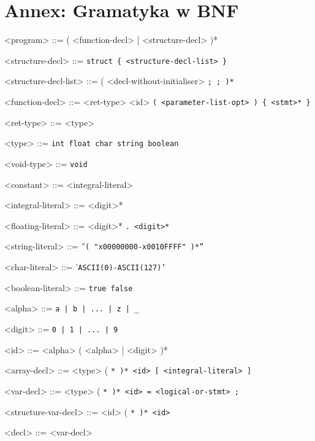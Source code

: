 \section{Annex: Gramatyka w BNF}

    \setlength{\grammarindent}{12em}

    \begin{grammar}
        <program> ::= ( <function-decl> | <structure-decl> )*

        <structure-decl> ::= \tt{struct} \tt{\{} <structure-decl-list> \tt{\}}

        <structure-decl-list> ::= (
        <decl-without-initialiser> \tt{;}
         \tt{;}
        )*

        <function-decl> ::= <ret-type> <id> \tt{(} <parameter-list-opt> \tt{)} \tt{\{} <stmt>* \tt{\}}

        <ret-type> ::= <type>

        <type> ::= \tt{int}
        \alt \tt{float}
        \alt \tt{char}
        \alt \tt{string}
        \alt \tt{boolean}

        <void-type> ::= \tt{void}

        <constant> ::= <integral-literal>

        <integral-literal> ::= <digit>*
        
        <floating-literal> ::= <digit>* \tt{.} <digit>*

        <string-literal> ::= ''\tt{( "x00000000-x0010FFFF" )*}''

        <char-literal> ::= '\tt{ASCII(0)}-\tt{ASCII(127)}'

        <boolean-literal> ::= \tt{true}
        \alt \tt{false}

        <alpha> ::= \tt{a} | \tt{b} | ... | \tt{z} | \tt{_}

        <digit> ::= \tt{0} | \tt{1} | ... | \tt{9}

        <id> ::= <alpha> ( <alpha> | <digit> )*

        <array-decl> ::= <type> ( \tt{*} )* <id> \tt{[} <integral-literal> \tt{]}

        <var-decl> ::= <type> ( \tt{*} )* <id> \tt{=} <logical-or-stmt> \tt{;}
        
        <structure-var-decl> ::= <id> ( \tt{*} )* <id>

        <decl> ::= <var-decl>


\end{grammar}
